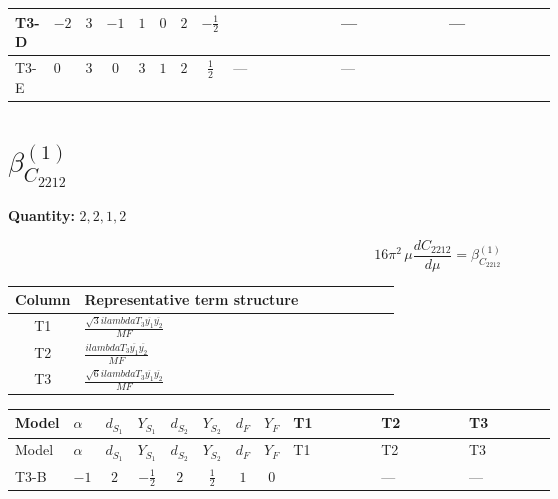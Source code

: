 \documentclass[8pt]{article}
\begin{document}
\begin{landscape}
\begin{longtable}{@{}llcccccc >{\raggedright\arraybackslash}p{0.21\linewidth} >{\raggedright\arraybackslash}p{0.21\linewidth} >{\raggedright\arraybackslash}p{0.21\linewidth}@{}}
\midrule
T3-D & $-2$ & $3$ & $-1$ & $1$ & $0$ & $2$ & $-\frac{1}{2}$ & \scriptsize\adjustbox{max width=\linewidth}{$\begin{gathered} \frac{2 \sqrt{3} lambdaT_{3} \overline{y_{1}} \overline{y_{2}}}{3 MF}\end{gathered}$} & --- & --- \\
\midrule
T3-E & $0$ & $3$ & $0$ & $3$ & $1$ & $2$ & $\frac{1}{2}$ & --- & --- & \scriptsize\adjustbox{max width=\linewidth}{$\begin{gathered} - \frac{2 \sqrt{6} lambdaT_{3} \overline{y_{1}} \overline{y_{2}}}{3 MF}\end{gathered}$} \\
\midrule
\bottomrule
\end{longtable}
\clearpage
\section*{$\beta_{C_{2212}}^{(1)}$}
\noindent\textbf{Quantity: }$\mathrm{2,2,1,2}$\par\smallskip
\[16\pi^2\,\mu\frac{d C_{2212}}{d\mu}=\beta_{C_{2212}}^{(1)}\]
\begin{center}
\begin{tabular}{@{}c >{\raggedright\arraybackslash}p{0.82\linewidth}@{}}
\toprule
Column & Representative term structure \\
\midrule
T1 & \(\displaystyle \frac{\sqrt{3} i lambdaT_{3} \overline{y_{1}} \overline{y_{2}}}{MF}\) \\
\midrule
T2 & \(\displaystyle \frac{i lambdaT_{3} \overline{y_{1}} \overline{y_{2}}}{MF}\) \\
\midrule
T3 & \(\displaystyle \frac{\sqrt{6} i lambdaT_{3} \overline{y_{1}} \overline{y_{2}}}{MF}\) \\
\midrule
\bottomrule
\end{tabular}
\end{center}
\smallskip
\tiny
\begin{longtable}{@{}llcccccc >{\raggedright\arraybackslash}p{0.21\linewidth} >{\raggedright\arraybackslash}p{0.21\linewidth} >{\raggedright\arraybackslash}p{0.21\linewidth}@{}}
\toprule
Model & $\alpha$ & $d_{S_1}$ & $Y_{S_1}$ & $d_{S_2}$ & $Y_{S_2}$ & $d_F$ & $Y_F$ & T1 & T2 & T3 \\
\midrule
\endfirsthead
\toprule
Model & $\alpha$ & $d_{S_1}$ & $Y_{S_1}$ & $d_{S_2}$ & $Y_{S_2}$ & $d_F$ & $Y_F$ & T1 & T2 & T3 \\
\midrule
\endhead
T3-B & $-1$ & $2$ & $-\frac{1}{2}$ & $2$ & $\frac{1}{2}$ & $1$ & $0$ & \scriptsize\adjustbox{max width=\linewidth}{$\begin{gathered} \frac{2 \sqrt{3} i lambdaT_{3} \overline{y_{1}} \overline{y_{2}}}{3 MF}\end{gathered}$} & --- & --- \\

\end{longtable}
\end{landscape}
\end{document}
